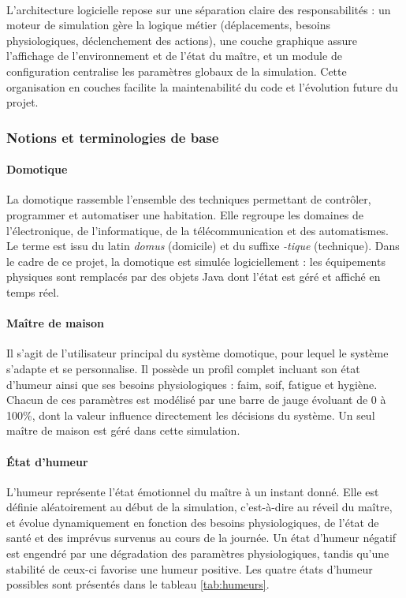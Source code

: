 \paragraph{} L'architecture logicielle repose sur une séparation claire des responsabilités : 
un moteur de simulation gère la logique métier (déplacements, besoins physiologiques, 
déclenchement des actions), une couche graphique assure l'affichage de l'environnement et 
de l'état du maître, et un module de configuration centralise les paramètres globaux de la 
simulation. Cette organisation en couches facilite la maintenabilité du code et l'évolution 
future du projet.

\subsubsection{Notions et terminologies de base}

\paragraph{Domotique} La domotique rassemble l'ensemble des techniques permettant de 
contrôler, programmer et automatiser une habitation. Elle regroupe les domaines de 
l'électronique, de l'informatique, de la télécommunication et des automatismes. Le terme 
est issu du latin \textit{domus} (domicile) et du suffixe \textit{-tique} (technique). Dans 
le cadre de ce projet, la domotique est simulée logiciellement : les équipements physiques 
sont remplacés par des objets Java dont l'état est géré et affiché en temps réel.

\paragraph{Maître de maison} Il s'agit de l'utilisateur principal du système domotique, 
pour lequel le système s'adapte et se personnalise. Il possède un profil complet incluant 
son état d'humeur ainsi que ses besoins physiologiques : faim, soif, fatigue et hygiène. 
Chacun de ces paramètres est modélisé par une barre de jauge évoluant de 0 à 100\%, dont 
la valeur influence directement les décisions du système. Un seul maître de maison est 
géré dans cette simulation.

\paragraph{État d'humeur} L'humeur représente l'état émotionnel du maître à un instant 
donné. Elle est définie aléatoirement au début de la simulation, c'est-à-dire au réveil 
du maître, et évolue dynamiquement en fonction des besoins physiologiques, de l'état de 
santé et des imprévus survenus au cours de la journée. Un état d'humeur négatif est 
engendré par une dégradation des paramètres physiologiques, tandis qu'une stabilité de 
ceux-ci favorise une humeur positive. Les quatre états d'humeur possibles sont présentés 
dans le tableau \ref{tab:humeurs}.

